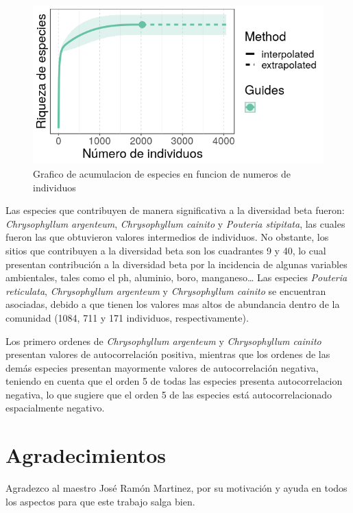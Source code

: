 \documentclass[11pt,]{article}
\begin{document}
\begin{figure}
\centering
\includegraphics{acumulacion_especies_individuos.png}
\caption{Grafico de acumulacion de especies en funcion de numeros de
individuos \label{fig:acumulacion_especies_individuos}}
\end{figure}

Las especies que contribuyen de manera significativa a la diversidad
beta fueron: \emph{Chrysophyllum argenteum}, \emph{Chrysophyllum
cainito} y \emph{Pouteria stipitata}, las cuales fueron las que
obtuvieron valores intermedios de individuos. No obstante, los sitios
que contribuyen a la diversidad beta son los cuadrantes 9 y 40, lo cual
presentan contribución a la diversidad beta por la incidencia de algunas
variables ambientales, tales como el ph, aluminio, boro,
manganeso\ldots{} Las especies \emph{Pouteria reticulata},
\emph{Chrysophyllum argenteum} y \emph{Chrysophyllum cainito} se
encuentran asociadas, debido a que tienen los valores mas altos de
abundancia dentro de la comunidad (1084, 711 y 171 individuos,
respectivamente).

Los primero ordenes de \emph{Chrysophyllum argenteum} y
\emph{Chrysophyllum cainito} presentan valores de autocorrelación
positiva, mientras que los ordenes de las demás especies presentan
mayormente valores de autocorrelación negativa, teniendo en cuenta que
el orden 5 de todas las especies presenta autocorrelacion negativa, lo
que sugiere que el orden 5 de las especies está autocorrelacionado
espacialmente negativo.

\section{Agradecimientos}\label{agradecimientos}

Agradezco al maestro José Ramón Martinez, por su motivación y ayuda en
todos los aspectos para que este trabajo salga bien.
\end{document}
